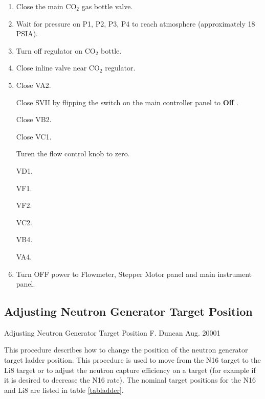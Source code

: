\begin{enumerate}

\item\checkbox Close the main CO$_2$ gas bottle
  valve.
  
\item\checkbox Wait for pressure on P1, P2, P3, P4 to reach atmosphere
  (approximately 18 PSIA).
  
\item\checkbox Turn off regulator on CO$_2$ bottle.
  
\item\checkbox Close inline valve near CO$_2$ regulator.
  
\item\checkbox Close VA2.

\checkitem Close SVII by flipping the switch on the main controller
panel to {\bf Off }.

\checkitem Close VB2.

\checkitem Close VC1.

\checkitem Turen the flow control knob to zero.

\checkitem VD1.

\checkitem VF1.

\checkitem VF2.

\checkitem VC2.

\checkitem VB4.

\checkitem VA4.


  
\item\checkbox Turn OFF power to Flowmeter, Stepper Motor panel and
main instrument panel.
  


\end{enumerate}




\newpage
\subsection{Adjusting Neutron Generator Target Position}


     {Adjusting Neutron Generator Target Position}
             {F. Duncan}
             {Aug. 2000}{1}

 
  This procedure describes how to change the position of
the neutron generator target ladder position.  This procedure
is used to move from the N16 target to the Li8 target or to
adjust the neutron capture efficiency on a target (for example if
it is desired to decrease the N16 rate).  The nominal target
positions for the N16 and Li8 are listed in table \ref{tabladder}.


